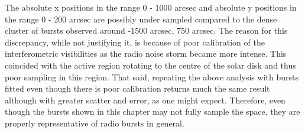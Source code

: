 

The absolute x positions in the range 0 - 1000 arcsec and absolute y positions in the range 0 - 200 arcsec are possibly under sampled compared to the dense cluster of bursts observed around -1500 arcsec, 750 arcsec. The reason for this discrepancy, while not justifying it, is because of poor calibration of the interferometric visibilities as the radio noise storm became more intense. This coincided with the active region rotating to the centre of the solar disk and thus poor sampling in this region. That said, repeating the above analysis with bursts fitted even though there is poor calibration returns much the same result although with greater scatter and error, as one might expect. Therefore, even though the bursts shown in this chapter may not fully sample the space, they are properly representative of radio bursts in general. %


